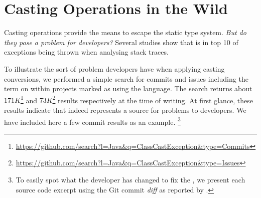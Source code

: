 
\newcommand{\castpatternsection}[1]{\noindent\textbf{#1.}}
\newcommand{\pname}[1]{\textsc{#1}}
\newcommand{\group}[1]{

\

\

{\noindent\Large\textsc{#1} Patterns}

\

}

\newenvironment{pattern}[1]{
	\newcommand{\desc}{\castpatternsection{Description}}
	\newcommand{\instances}{\castpatternsection{Instances}}
	\newcommand{\detection}{\castpatternsection{Detection}}
	\newcommand{\discussion}{\castpatternsection{Discussion}}
	\newcommand{\related}{\castpatternsection{Related Patterns}}
    \newcommand{\thisp}{\textsc{#1}}
    \subsection{\pname{#1}}
    \label{pat:#1}
	\desc
}{}

\chapter{Casting Operations in the Wild}
\label{cha:casts}

Casting operations provide the means to escape the static type system.
\emph{But do they pose a problem for developers?}
Several studies
\citep{kechagiaUndocumentedUncheckedExceptions2014,coelhoUnveilingExceptionHandling2015,zhitnitskyTop10Exception2016}
show that  is in top 10 of exceptions being
thrown when analysing stack traces.

To illustrate the sort of problem developers have when applying casting
conversions, we performed a simple search for commits and issues
including the term  on \github{}
within projects marked as using the \java{} language.
The search returns about
$171K$\footnote{\url{https://github.com/search?l=Java&q=ClassCastException&type=Commits}}
and
$73K$\footnote{\url{https://github.com/search?l=Java&q=ClassCastException&type=Issues}}
results respectively at the time of writing.
At first glance, these results indicate that indeed
 represents a source for
problems to developers.
We have included here a few commit results as an example.%
\footnote{To easily spot what the developer has changed to fix
the , we present each source code excerpt
using the Git commit \emph{diff} as reported by \github{}.}


